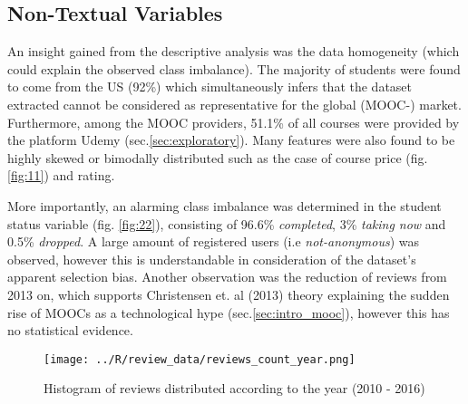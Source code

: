 \documentclass[
	a4paper,
	pdftex,
	12pt,	
	footinclude=true,
	fleqn,
	final,
	]{report}%
\begin{document}
\vspace{-0.4cm}
\subsection*{Non-Textual Variables}
\vspace{-0.4cm}
An insight gained from the descriptive analysis was the data 
homogeneity (which could explain the observed class imbalance). 
The majority of students were found to come from the
US (92\%) which simultaneously infers that the dataset extracted cannot be considered as
representative for the global (MOOC-) market. Furthermore, 
among the MOOC providers, 51.1\% of all courses were provided 
by the platform Udemy (sec.\ref{sec:exploratory}). 
Many features were also found to be highly skewed or bimodally distributed 
such as the case of course price (fig. \ref{fig:11}) and rating.

More importantly, an alarming class imbalance was determined
in the student status variable (fig. \ref{fig:22}), consisting of 96.6\% \emph{completed},
3\% \emph{taking now} and 0.5\% \emph{dropped}. 
A large amount of registered users (i.e \emph{not-anonymous})
was observed, however this is understandable in consideration of 
the dataset's apparent selection bias. 
Another observation was the reduction of reviews 
from 2013 on, which supports Christensen et. al (2013) 
theory explaining the sudden rise of MOOCs as a technological hype 
(sec.\ref{sec:intro_mooc}), however this has no statistical evidence.
\vspace{-0.4cm}
\begin{figure}[h]
 \centering
 \texttt{[image: ../R/review\_data/reviews\_count\_year.png]}
\caption[Timeline of Coursetalk according to reviews]{\small \centering Histogram of reviews distributed according to the year (2010 - 2016)}
 \label{fig:13}
\end{figure}
\end{document}
